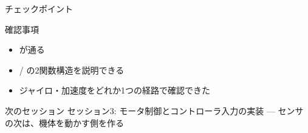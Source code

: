 \begin{frame}{チェックポイント}
  \begin{alertblock}{確認事項}
    \begin{itemize}
      \item[$\square$]  が通る
      \item[$\square$] / の2関数構造を説明できる
      \item[$\square$] ジャイロ・加速度をどれか1つの経路で確認できた
    \end{itemize}
  \end{alertblock}

  \vspace{1em}

  \begin{block}{次のセッション}
    セッション3: モータ制御とコントローラ入力の実装 --- センサの次は、機体を動かす側を作る
  \end{block}
\end{frame}
